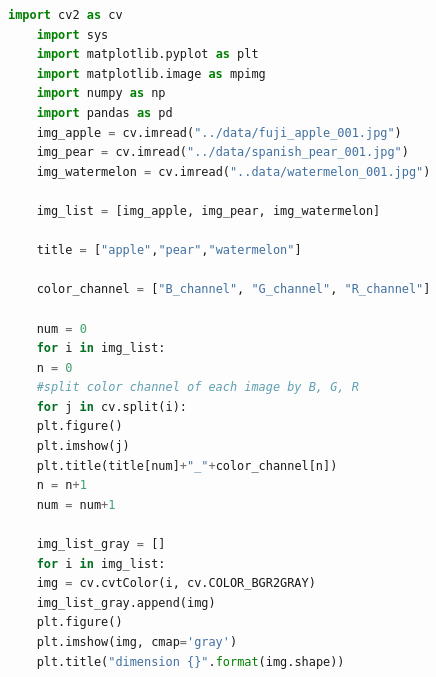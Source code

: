\documentclass{article}
\begin{document}
\begin{lstlisting}[language=Python]
	import cv2 as cv
	import sys
	import matplotlib.pyplot as plt
	import matplotlib.image as mpimg
	import numpy as np
	import pandas as pd
	img_apple = cv.imread("../data/fuji_apple_001.jpg")
	img_pear = cv.imread("../data/spanish_pear_001.jpg")
	img_watermelon = cv.imread("..data/watermelon_001.jpg")
	
	img_list = [img_apple, img_pear, img_watermelon]
	
	title = ["apple","pear","watermelon"]
	
	color_channel = ["B_channel", "G_channel", "R_channel"]
	
	num = 0
	for i in img_list:
	n = 0
	#split color channel of each image by B, G, R
	for j in cv.split(i):
	plt.figure()
	plt.imshow(j)
	plt.title(title[num]+"_"+color_channel[n])
	n = n+1
	num = num+1
	
	img_list_gray = []
	for i in img_list:
	img = cv.cvtColor(i, cv.COLOR_BGR2GRAY)
	img_list_gray.append(img)
	plt.figure()
	plt.imshow(img, cmap='gray')
	plt.title("dimension {}".format(img.shape))
\end{lstlisting}
\end{document}
